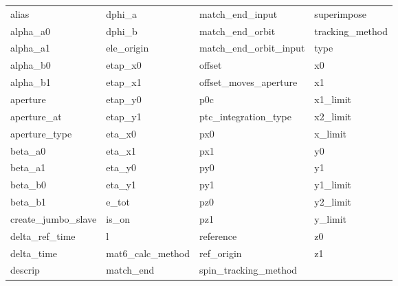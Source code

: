  \begin{tabular}{llll} \toprule
alias                       & dphi_a                      & match_end_input             & superimpose                 \\
alpha_a0                    & dphi_b                      & match_end_orbit             & tracking_method             \\
alpha_a1                    & ele_origin                  & match_end_orbit_input       & type                        \\
alpha_b0                    & etap_x0                     & offset                      & x0                          \\
alpha_b1                    & etap_x1                     & offset_moves_aperture       & x1                          \\
aperture                    & etap_y0                     & p0c                         & x1_limit                    \\
aperture_at                 & etap_y1                     & ptc_integration_type        & x2_limit                    \\
aperture_type               & eta_x0                      & px0                         & x_limit                     \\
beta_a0                     & eta_x1                      & px1                         & y0                          \\
beta_a1                     & eta_y0                      & py0                         & y1                          \\
beta_b0                     & eta_y1                      & py1                         & y1_limit                    \\
beta_b1                     & e_tot                       & pz0                         & y2_limit                    \\
create_jumbo_slave          & is_on                       & pz1                         & y_limit                     \\
delta_ref_time              & l                           & reference                   & z0                          \\
delta_time                  & mat6_calc_method            & ref_origin                  & z1                          \\
descrip                     & match_end                   & spin_tracking_method        &                             \\
 \bottomrule
 \end{tabular}
 \vfill
 
